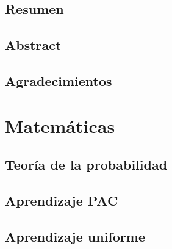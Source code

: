 \documentclass[oneside,openany,titlepage,dottedtoc,headinclude,%
               footinclude=true,cleardoublepage=empty,abstractoff, %
               paper=a4,fontsize=11pt,%
               ]{scrreprt}
\begin{document}
\makeatletter
\makeatother



\chapter*{Resumen}
  
\chapter*{Abstract}
  
\chapter*{Agradecimientos}
  

\setcounter{tocdepth}{1}
\tableofcontents

\break 

\setcounter{page}{1}

\makeatletter
\makeatother





\part{Matemáticas}  
  \chapter{Teoría de la probabilidad}
    
  \chapter{Aprendizaje PAC}
    
    
  \chapter{Aprendizaje uniforme}
    
\end{document}

